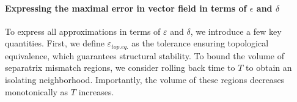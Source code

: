 \documentclass{article}
\newcommand{\ascomment}[1]{\textcolor{ascolor}{(#1)}}
\theoremstyle{definition} \newtheorem{definition}{Definition}
\theoremstyle{remark} \newtheorem{remark}{Remark}
\newcommand{\vol}{\operatorname{vol}}
\newcounter{ct}
\begin{document}


\paragraph{Expressing the maximal error in vector field in terms of $\epsilon$ and $\delta$}  
To express all approximations in terms of $\varepsilon$ and $\delta$, we introduce a few key quantities. First, we define $\varepsilon_{top.eq.}$ as the tolerance ensuring topological equivalence, which guarantees structural stability.  
To bound the volume of separatrix mismatch regions, we consider rolling back time to $T$ to obtain an isolating neighborhood.
Importantly, the volume of these regions decreases monotonically as $T$ increases.
\end{document}
